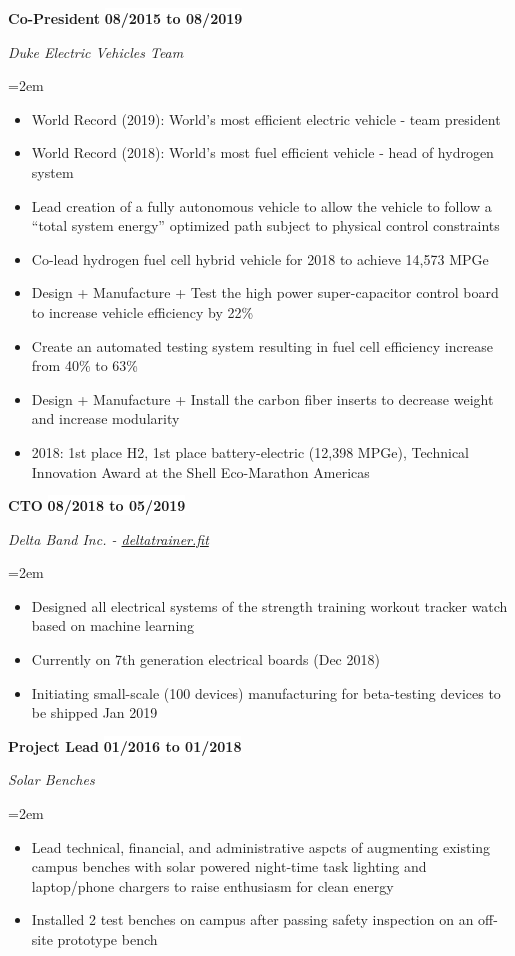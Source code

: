 \documentclass[paper=letter,fontsize=11pt]{scrartcl} %
\newcommand{\sepspace}{\vspace*{0em}}		%
\newcommand{\EducationEntry}[4]{
		\noindent \textbf{#1} \hfill      %
		\colorbox{White}{%
			\bf 
			\parbox{10em}{%
			\hfill\color{Black}#2}} \par  %
		\noindent \textit{#3} \par        %
		\noindent\hangindent=2em\hangafter=0 \small #4 %
		\normalsize \par}
\newcommand{\WorkEntry}[4]{				  %
		\noindent \textbf{#1} \hfill      %
		\colorbox{White}{\bf \color{Black}#2} \par  %
		\noindent \textit{#3} \par              %
		\noindent\hangindent=2em\hangafter=0 \small #4 %
		\normalsize \par}
\begin{document}
\WorkEntry{Co-President}{08/2015 to 08/2019}{Duke Electric Vehicles Team}{
	\begin{itemize}
		\item World Record (2019): World's most efficient electric vehicle - team president
		\item World Record (2018): World's most fuel efficient vehicle - head of hydrogen system
		\item Lead creation of a fully autonomous vehicle to allow the vehicle to follow a ``total system energy'' optimized path subject to physical control constraints
		\item Co-lead hydrogen fuel cell hybrid vehicle for 2018 to achieve 14,573 MPGe
		\item Design + Manufacture + Test the high power super-capacitor control board to increase vehicle efficiency by 22\%
		\item Create an automated testing system resulting in fuel cell efficiency increase from 40\% to 63\%
		\item Design + Manufacture + Install the carbon fiber inserts to decrease weight and increase modularity
		\item 2018: 1st place H2, 1st place battery-electric (12,398 MPGe), Technical Innovation Award at the Shell Eco-Marathon Americas
	\end{itemize}
}
\sepspace

\WorkEntry{CTO}{08/2018 to 05/2019}{Delta Band Inc. - \href{deltatrainer.fit}{deltatrainer.fit}}{
	\begin{itemize}
		\item Designed all electrical systems of the strength training workout tracker watch based on machine learning
		\item Currently on 7th generation electrical boards (Dec 2018)
		\item Initiating small-scale (100 devices) manufacturing for beta-testing devices to be shipped Jan 2019
	\end{itemize}
}
\sepspace

\WorkEntry{Project Lead}{01/2016 to 01/2018}{Solar Benches}{
	\begin{itemize}
		\item Lead technical, financial, and administrative aspcts of augmenting existing campus benches with solar powered night-time task lighting and laptop/phone chargers to raise enthusiasm for clean energy
		\item Installed 2 test benches on campus after passing safety inspection on an off-site prototype bench
	\end{itemize}
}
\end{document}

